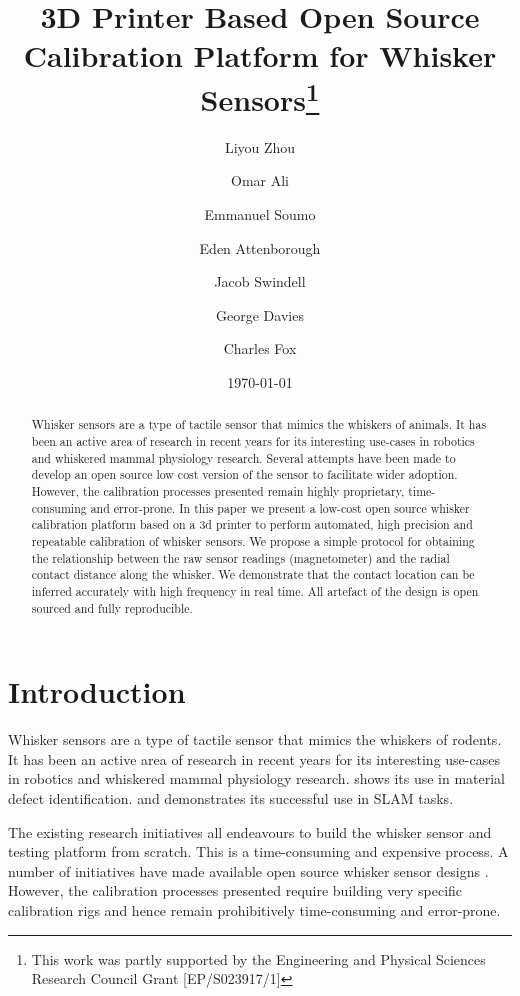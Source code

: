 \documentclass[runningheads]{llncs}
\title{3D Printer Based Open Source Calibration Platform for Whisker Sensors\thanks{This work was partly supported by the Engineering and Physical Sciences
Research Council Grant [EP/S023917/1]}}
\author{
    Liyou Zhou\orcidID{0009-0005-9491-9003} \and
    Omar Ali \and
    Emmanuel Soumo \and
    Eden Attenborough \and
    Jacob Swindell \and
    George Davies \and
    Charles Fox
}
\institute{School of Computer Science, University of Lincoln, Lincoln, UK}
\date{\today}
\begin{document}
\maketitle

\begin{abstract}
Whisker sensors are a type of tactile sensor that mimics the whiskers of animals. It has been an active area of research in recent years for its interesting use-cases in robotics and whiskered mammal physiology research. Several attempts have been made to develop an open source low cost version of the sensor to facilitate wider adoption. However, the calibration processes presented remain highly proprietary, time-consuming and error-prone. In this paper we present a low-cost open source whisker calibration platform based on a 3d printer to perform automated, high precision and repeatable calibration of whisker sensors. We propose a simple protocol for obtaining the relationship between the raw sensor readings (magnetometer) and the radial contact distance along the whisker. We demonstrate that the contact location can be inferred accurately with high frequency in real time. All artefact of the design is open sourced and fully reproducible.
\end{abstract}

\section{Introduction}

Whisker sensors are a type of tactile sensor that mimics the whiskers of rodents. It has been an active area of research in recent years for its interesting use-cases in robotics and whiskered mammal physiology research\cite{prescottActiveTouchSensing2020}. \cite{fotouhiDetectionBarelyVisible2021} shows its use in material defect identification. \cite{struckmeierViTaSLAMBioinspiredVisuoTactile2019} and \cite{foxTactileSLAMBiomimetic2012} demonstrates its successful use in SLAM tasks.

The existing research initiatives all endeavours to build the whisker sensor and testing platform from scratch. This is a time-consuming and expensive process. A number of initiatives have made available open source whisker sensor designs \cite{FoRGroup1OpenWhisker2024} \cite{RatatouilleWhiskersOpenWhiskerOpen}. However, the calibration processes presented require building very specific calibration rigs and hence remain prohibitively time-consuming and error-prone.
\end{document}
